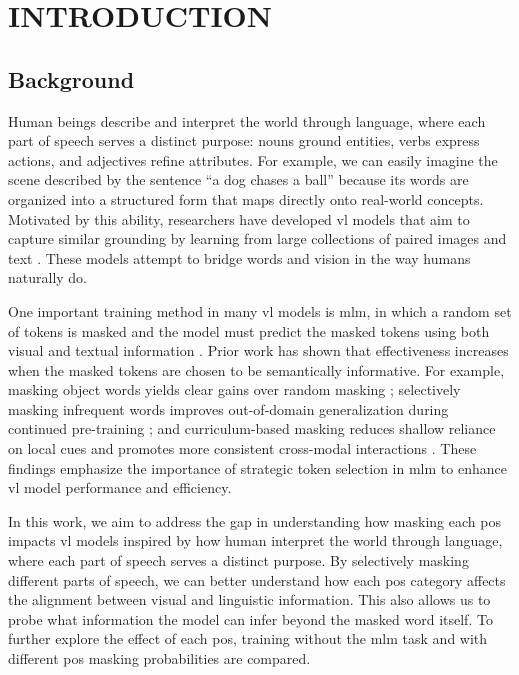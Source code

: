 \setlength{\parindent}{0in}
\setlength{\parskip}{1.5mm}
\setlength{\baselineskip}{1.6em}

\chapter{INTRODUCTION}
\section{Background}
Human beings describe and interpret the world through language, where each part of speech serves a distinct purpose: nouns ground entities, verbs express actions, and adjectives refine attributes. 
For example, we can easily imagine the scene described by the sentence “a dog chases a ball” because its words are organized into a structured form that maps directly onto real-world concepts. 
Motivated by this ability, researchers have developed \acrfull{vl} models that aim to capture similar grounding by learning from large collections of paired images and text \cite{clip,uniter}.
These models attempt to bridge words and vision in the way humans naturally do.

One important training method in many \acrshort{vl} models is \acrfull{mlm}, in which a random set of tokens is masked and the model must predict the masked tokens using both visual and textual information \cite{albef, mplug, uniter, beit-3}. 
Prior work has shown that effectiveness increases when the masked tokens are chosen to be semantically informative. 
For example, masking object words yields clear gains over random masking \cite{mask_object}; selectively masking infrequent words improves out-of-domain generalization during continued pre-training \cite{selective_masking}; and curriculum-based masking reduces shallow reliance on local cues and promotes more consistent cross-modal interactions \cite{rf-curriculum-masking}. 
These findings emphasize the importance of strategic token selection in \acrshort{mlm} to enhance \acrshort{vl} model performance and efficiency.

In this work, we aim to address the gap in understanding how masking each \acrfull{pos} impacts \acrshort{vl} models inspired by how human interpret the world through language, where each part of speech serves a distinct purpose.
By selectively masking different parts of speech, we can better understand how each \acrshort{pos} category affects the alignment between visual and linguistic information.
This also allows us to probe what information the model can infer beyond the masked word itself.
To further explore the effect of each \acrshort{pos}, training without the \acrshort{mlm} task and with different \acrshort{pos} masking probabilities are compared.

